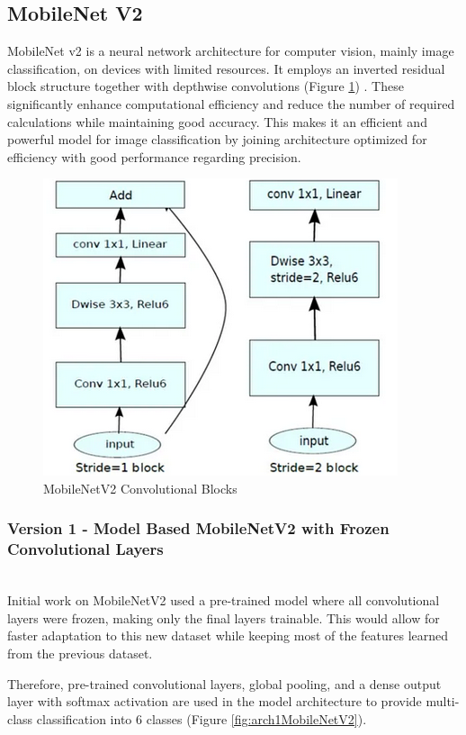 \documentclass[conference]{IEEEtran}
\begin{document}
\subsection{MobileNet V2}

MobileNet v2 is a neural network architecture for computer vision, mainly image classification, on devices with limited resources. It employs an inverted residual block structure together with depthwise convolutions (Figure \ref{fig:mobileNetV2CB}) \cite{web:MobileNetV2:2019}. These significantly enhance computational efficiency and reduce the number of required calculations while maintaining good accuracy. This makes it an efficient and powerful model for image classification by joining architecture optimized for efficiency with good performance regarding precision.

\begin{figure}[H]
    \centering
    \includegraphics[width=0.6\linewidth]{images/mobileNetV2Architecture.png}
    \caption{MobileNetV2 Convolutional Blocks}
    \label{fig:mobileNetV2CB}
\end{figure}

\subsubsection{Version 1 - Model Based MobileNetV2 with Frozen Convolutional Layers}
\hfill\\

Initial work on MobileNetV2 used a pre-trained model where all convolutional layers were frozen, making only the final layers trainable. This would allow for faster adaptation to this new dataset while keeping most of the features learned from the previous dataset.

Therefore, pre-trained convolutional layers, global pooling, and a dense output layer with softmax activation are used in the model architecture to provide multi-class classification into 6 classes (Figure \ref{fig:arch1MobileNetV2}).
\end{document}
